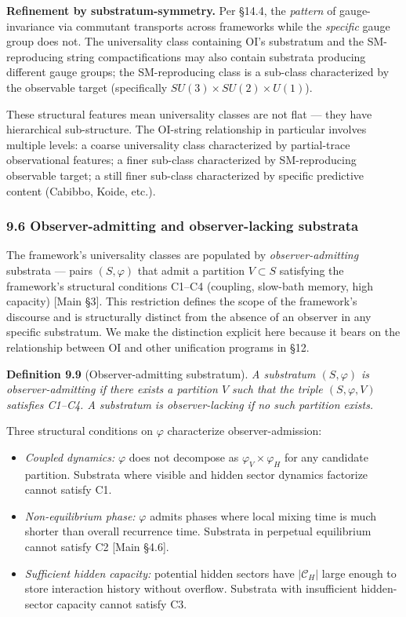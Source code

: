 \documentclass[
]{article}
\providecommand{\tightlist}{%
  \setlength{\itemsep}{0pt}\setlength{\parskip}{0pt}}
\begin{document}
\textbf{Refinement by substratum-symmetry.} Per §14.4, the
\emph{pattern} of gauge-invariance via commutant transports across
frameworks while the \emph{specific} gauge group does not. The
universality class containing OI's substratum and the SM-reproducing
string compactifications may also contain substrata producing different
gauge groups; the SM-reproducing class is a sub-class characterized by
the observable target (specifically \(SU(3) \times SU(2) \times U(1)\)).

These structural features mean universality classes are not flat ---
they have hierarchical sub-structure. The OI-string relationship in
particular involves multiple levels: a coarse universality class
characterized by partial-trace observational features; a finer sub-class
characterized by SM-reproducing observable target; a still finer
sub-class characterized by specific predictive content (Cabibbo, Koide,
etc.).

\hypertarget{observer-admitting-and-observer-lacking-substrata}{%
\subsubsection{9.6 Observer-admitting and observer-lacking
substrata}\label{observer-admitting-and-observer-lacking-substrata}}

The framework's universality classes are populated by
\emph{observer-admitting} substrata --- pairs \((S, \varphi)\) that
admit a partition \(V \subset S\) satisfying the framework's structural
conditions C1--C4 (coupling, slow-bath memory, high capacity) {[}Main
§3{]}. This restriction defines the scope of the framework's discourse
and is structurally distinct from the absence of an observer in any
specific substratum. We make the distinction explicit here because it
bears on the relationship between OI and other unification programs in
§12.

\textbf{Definition 9.9} (Observer-admitting substratum). \emph{A
substratum \((S, \varphi)\) is observer-admitting if there exists a
partition \(V\) such that the triple \((S, \varphi, V)\) satisfies
C1--C4. A substratum is observer-lacking if no such partition exists.}

Three structural conditions on \(\varphi\) characterize
observer-admission:

\begin{itemize}
\tightlist
\item
  \emph{Coupled dynamics:} \(\varphi\) does not decompose as
  \(\varphi_V \times \varphi_H\) for any candidate partition. Substrata
  where visible and hidden sector dynamics factorize cannot satisfy C1.
\item
  \emph{Non-equilibrium phase:} \(\varphi\) admits phases where local
  mixing time is much shorter than overall recurrence time. Substrata in
  perpetual equilibrium cannot satisfy C2 {[}Main §4.6{]}.
\item
  \emph{Sufficient hidden capacity:} potential hidden sectors have
  \(|\mathcal{C}_H|\) large enough to store interaction history without
  overflow. Substrata with insufficient hidden-sector capacity cannot
  satisfy C3.
\end{itemize}
\end{document}
